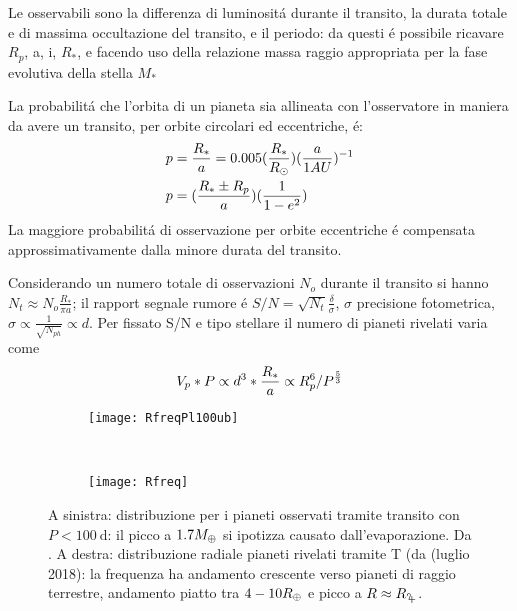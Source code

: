 Le osservabili sono la differenza di luminosit\'a durante il transito, la durata totale e di massima occultazione del transito, e il periodo: da questi \'e possibile ricavare $R_p$, a, i, $R_*$, e facendo uso della relazione massa raggio appropriata per la fase evolutiva della stella $M_*$

La probabilit\'a che l'orbita di un pianeta sia allineata con l'osservatore in maniera da avere un transito, per orbite circolari ed eccentriche, \'e:
\begin{align*}
&p=\frac{R_*}{a}=0.005(\frac{R_*}{R_{\odot}{}})(\frac{a}{1AU})^{-1}\\
&p=(\frac{R_*\pm R_p}{a})(\frac{1}{1-e^2})
\end{align*}
La maggiore probabilit\'a di osservazione per orbite eccentriche \'e compensata approssimativamente dalla minore durata del transito.

\begin{workout}
Considerando un numero totale di osservazioni $N_o$ durante il transito si hanno $N_t\approx N_o\frac{R_*}{\pi a}$; il rapport segnale rumore \'e $S/N=\sqrt{N_t}\frac{\delta}{\sigma}$, $\sigma$ precisione fotometrica, $\sigma\propto\frac{1}{\sqrt{N_{ph}}}\propto d$. Per fissato S/N e tipo stellare il numero di pianeti rivelati varia come
\begin{equation}
V_p*P\propto d^3*\frac{R_*}{a}\propto R_p^6/P^{\frac{5}{3}}
\end{equation}
\end{workout}



\begin{figure}[!ht] \begin{subfigure}[b]{0.45\textwidth} \centering \texttt{[image: RfreqPl100ub]} 
\label{fig:RfreqPl100ub} \end{subfigure} ~ \begin{subfigure}[b]{0.55\textwidth} \centering\texttt{[image: Rfreq]}\label{Rfreq}
 \end{subfigure}\caption{A sinistra: distribuzione per i pianeti osservati tramite transito con $P<\SI{100}{\day}$: il picco a $1.7M_{\oplus}{}$ si ipotizza causato dall'evaporazione. Da \cite{fulton2017california}. A destra: distribuzione radiale pianeti rivelati tramite T (da \cite{exoplanet.eu} (luglio 2018): la frequenza ha andamento crescente verso pianeti di raggio terrestre, andamento piatto tra $4-10R_{\oplus}{}$ e picco a $R\approx\rjupiter{}$.} \end{figure} 


